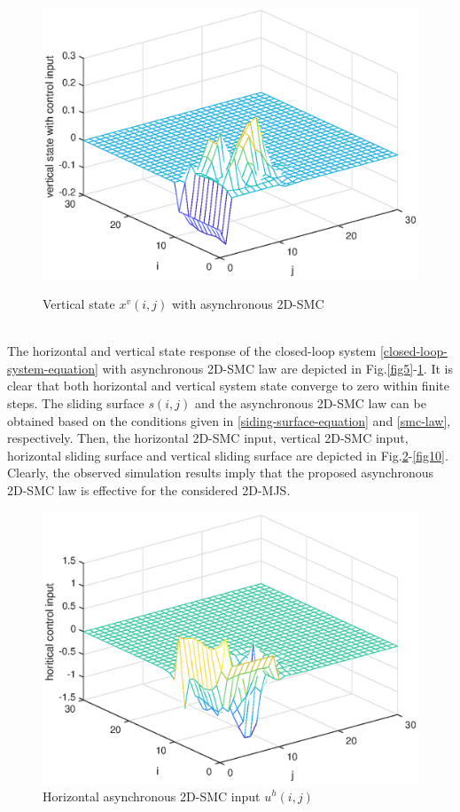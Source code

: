 \documentclass[journal,final,twocolumn]{IEEEtran}
\begin{document}
\begin{figure}[!htb]
	\centering\includegraphics[scale=0.6]{./simulations/v-state-with-force_eps.eps}\\ 
	\caption{Vertical state $x^{v}(i,j)$ with asynchronous 2D-SMC}
	\label{fig6}
\end{figure}
\\The horizontal and vertical state response of the closed-loop system \eqref{closed-loop-system-equation} with asynchronous 2D-SMC law are depicted in Fig.\ref{fig5}-\ref{fig6}. It is clear that both horizontal and vertical system state converge to zero within finite steps. The sliding surface $s(i,j)$ and the asynchronous 2D-SMC law can be obtained based on the conditions given in \eqref{siding-surface-equation} and \eqref{smc-law}, respectively. Then, the horizontal 2D-SMC input, vertical 2D-SMC input, horizontal sliding surface and vertical sliding surface are depicted in Fig.\ref{fig7}-\ref{fig10}.  Clearly, the observed simulation results imply that the proposed asynchronous 2D-SMC law is effective for the considered 2D-MJS.
\begin{figure}[!htb]
	\centering\includegraphics[scale=0.6]{./simulations/h-control-input_eps.eps}
	\caption{Horizontal  asynchronous 2D-SMC input $u^{h}(i,j)$}
	\label{fig7}
\end{figure}
\end{document}
